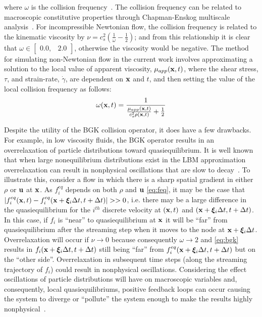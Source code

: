 \noindent where $\omega$ is the collision frequency~\cite{Bha54}.
The collision frequency can be related to macroscopic constitutive properties through Chapman-Enskog multiscale analysis~\cite{wolf2000lattice}.
For incompressible Newtonian flow, the collision frequency is related to the kinematic viscosity by $\nu = c_s^2(\frac{1}{\omega} - \frac{1}{2})$; and from this relationship it is clear that $\omega \in \begin{bmatrix}0.0,& 2.0\end{bmatrix}$, otherwise the viscosity would be negative.
The method for simulating non-Newtonian flow in the current work involves approximating a solution to the local value of apparent viscosity, $\mu_{app}(\mathbf{x}, t)$, where the shear stress, $\tau$, and strain-rate, $\dot{\gamma}$, are dependent on $\mathbf{x}$ and $t$, and then setting the value of the local collision frequency as follows:
\begin{equation} \label{eq:colfreq-non-newtonian}
\omega(\mathbf{x}, t) = \frac{1}{\frac{\mu_{app}(\mathbf{x}, t)}{c_s^2 \rho(\mathbf{x}, t)} + \frac{1}{2}}
\end{equation}

Despite the utility of the BGK collision operator, it does have a few drawbacks.
For example, in low viscosity fluids, the BGK operator results in an overrelaxation of particle distributions toward quasiequilibrium.
It is well known that when large nonequilibrium distributions exist in the LBM approximation \DIFdelbegin {}\DIFdelend overrelaxation can result in nonphysical oscillations that are slow to decay~\cite{brownlee2007stability,dellar2003incompressible}.
To illustrate this, consider a flow in which there is a sharp spatial gradient in either $\rho$ or $\mathbf{u}$ at $\mathbf{x}$.
As $f_i^{eq}$ depends on both $\rho$ and $\mathbf{u}$ \eqref{eq:feq}, it may be the case that $|f_i^{eq}(\mathbf{x}, t) - f_i^{eq}(\mathbf{x} + \boldsymbol{\xi}_i \Delta t, t + \Delta t)| >> 0$, i.e. there may be a large difference in the quasiequilibrium for the $i^{th}$ discrete velocity at $(\mathbf{x}, t)$ and $(\mathbf{x} + \boldsymbol{\xi}_i \Delta t, t + \Delta t)$.
In this case, if $f_i$ is ``near'' to quasiequilibrium at $\mathbf{x}$ it will be ``far'' from quasiequilibrium after the streaming step when it moves to the node at $\mathbf{x} + \boldsymbol{\xi}_i \Delta t$.
Overrelaxation will occur if $\nu \rightarrow 0$ because consequently $\omega \rightarrow 2$ and \eqref{eq:bgk} results in $f_i(\mathbf{x} + \boldsymbol{\xi}_i \Delta t,t + \Delta t)$ still being ``far'' from $f^{eq}_i(\mathbf{x} + \boldsymbol{\xi}_i \Delta t,t + \Delta t)$ but on the ``other side''.
Overrelaxation in subsequent time steps (along the streaming trajectory of $f_i$) could result in nonphysical oscillations.
Considering the effect oscillations of particle distributions will have on macroscopic variables and, consequently, local quasiequilibriums, positive feedback loops can occur causing the system to diverge or ``pollute'' the system enough to make the results highly nonphysical~\cite{gorban2014enhancement}.

